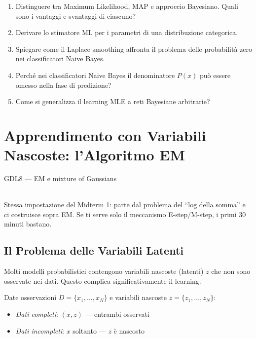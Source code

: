 \begin{tcolorbox}[title=Domande d'Esame]
  \begin{enumerate}
    \item Distinguere tra Maximum Likelihood, MAP e approccio Bayesiano. Quali sono i vantaggi e svantaggi di ciascuno?
    \item Derivare lo stimatore ML per i parametri di una distribuzione categorica.
    \item Spiegare come il Laplace smoothing affronta il problema delle probabilità zero nei classificatori Naive Bayes.
    \item Perché nei classificatori Naive Bayes il denominatore $P(x)$ può essere omesso nella fase di predizione?
    \item Come si generalizza il learning MLE a reti Bayesiane arbitrarie?
  \end{enumerate}
\end{tcolorbox}

\chapter{Apprendimento con Variabili Nascoste: l'Algoritmo EM}\label{ch:em}

\begin{risorsevideo}{GDL8 — EM e mixture of Gaussians}

\medskip
{}\\
Stessa impostazione del Midterm 1: parte dal problema del ``log della somma'' e ci costruisce sopra EM. Se ti serve solo il meccanismo E-step/M-step, i primi $30$ minuti bastano.
\end{risorsevideo}

\section{Il Problema delle Variabili Latenti}

Molti modelli probabilistici contengono variabili nascoste (latenti) $z$ che non sono osservate nei dati. Questo complica significativamente il learning.

\begin{definition}
  Date osservazioni $D = \{x_1, \ldots, x_N\}$ e variabili nascoste $z = \{z_1, \ldots, z_N\}$:
  \begin{itemize}
    \item \textit{Dati completi}: $(x, z)$ --- entrambi osservati
    \item \textit{Dati incompleti}: $x$ soltanto --- $z$ è nascosto
  \end{itemize}
\end{definition}

